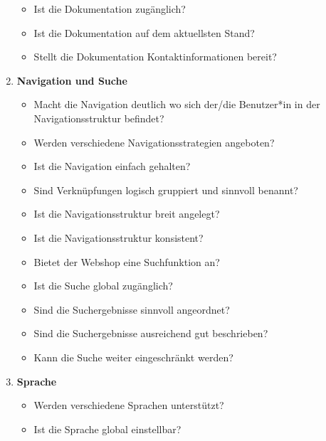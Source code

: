\documentclass[utf8,biblatex]{lni}
\begin{document}
\begin{appendices}
\begin{enumerate}
\begin{itemize}
    \item Ist die Dokumentation zugänglich?
    \item Ist die Dokumentation auf dem aktuellsten Stand?
    \item Stellt die Dokumentation Kontaktinformationen bereit?
  \end{itemize}
  \item \textbf{Navigation und Suche}
  \begin{itemize}
    \item Macht die Navigation deutlich wo sich der/die Benutzer*in in der Navigationsstruktur befindet?
    \item Werden verschiedene Navigationsstrategien angeboten?
    \item Ist die Navigation einfach gehalten?
    \item Sind Verknüpfungen logisch gruppiert und sinnvoll benannt?
    \item Ist die Navigationsstruktur breit angelegt?
    \item Ist die Navigationsstruktur konsistent?
    \item Bietet der Webshop eine Suchfunktion an?
    \item Ist die Suche global zugänglich?
    \item Sind die Suchergebnisse sinnvoll angeordnet?
    \item Sind die Suchergebnisse ausreichend gut beschrieben?
    \item Kann die Suche weiter eingeschränkt werden?
  \end{itemize}
  \item \textbf{Sprache}
  \begin{itemize}
    \item Werden verschiedene Sprachen unterstützt?
    \item Ist die Sprache global einstellbar?
  \end{itemize}
\end{enumerate}
\end{appendices}
\end{document}
